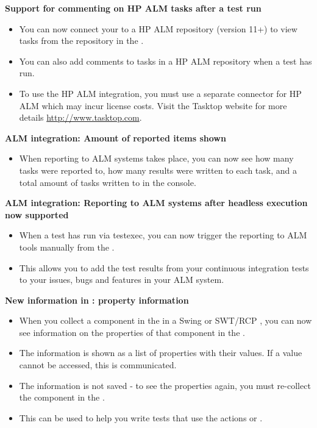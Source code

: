 \textbf{Support for commenting on HP ALM tasks after a test run}
\begin{itemize}
\item You can now connect your \ite{} to a HP ALM repository (version 11+) to view tasks from the repository in the \ite{}.
\item You can also add comments to tasks in a HP ALM repository when a test has run.
\item To use the HP ALM integration, you must use a separate connector for HP ALM which may incur license costs. Visit the Tasktop website for more details \url{http://www.tasktop.com}.
\end{itemize} 

\textbf{ALM integration: Amount of reported items shown}
\begin{itemize}
\item When reporting to ALM systems takes place, you can now see how many tasks were reported to, how many results were written to each task, and a total amount of tasks written to in the console.
\end{itemize}

\textbf{ALM integration: Reporting to ALM systems after headless execution now supported}
\begin{itemize}
\item When a test has run via testexec, you can now trigger the reporting to ALM tools manually from the \gdtestsummaryview{}. 
\item This allows you to add the test results from your continuous integration tests to your issues, bugs and features in your ALM system. 
\end{itemize}


\textbf{New information in \gdomm{} : property information}
\begin{itemize}
\item When you collect a component in the \gdomm{} in a Swing or SWT/RCP \gdaut{}, you can now see information on the properties of that component in the \gdpropview{}.
\item The information is shown as a list of properties with their values. If a value cannot be accessed, this is communicated.
\item The information is not saved - to see the properties again, you must re-collect the component in the \gdomm{}.
\item This can be used to help you write tests that use the actions  or .
\end{itemize}

